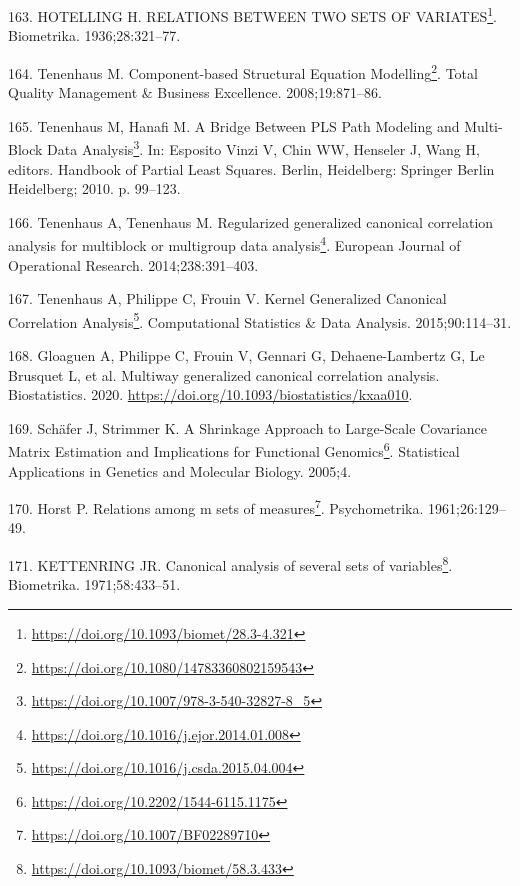 \documentclass[
  12pt,
  a4paper,
  twoside,
  openright]{book}
\DeclareRobustCommand{\href}[2]{#2\footnote{\url{#1}}}
\newlength{\cslhangindent}
\newlength{\cslentryspacingunit} %
\newenvironment{CSLReferences}[2] %
 {%
  \setlength{\parindent}{0pt}
  \ifodd #1
  \let\oldpar\par
  \def\par{\hangindent=\cslhangindent\oldpar}
  \fi
  \setlength{\parskip}{#2\cslentryspacingunit}
 }%
 {}
\begin{document}
\begin{CSLReferences}{0}{0}
\leavevmode{}%
163. HOTELLING H. \href{https://doi.org/10.1093/biomet/28.3-4.321}{RELATIONS BETWEEN TWO SETS OF VARIATES}. Biometrika. 1936;28:321--77.

\leavevmode{}%
164. Tenenhaus M. \href{https://doi.org/10.1080/14783360802159543}{Component-based {Structural Equation Modelling}}. Total Quality Management \& Business Excellence. 2008;19:871--86.

\leavevmode{}%
165. Tenenhaus M, Hanafi M. \href{https://doi.org/10.1007/978-3-540-32827-8_5}{A {Bridge Between PLS Path Modeling} and {Multi}-{Block Data Analysis}}. In: Esposito Vinzi V, Chin WW, Henseler J, Wang H, editors. Handbook of {Partial Least Squares}. Berlin, Heidelberg: {Springer Berlin Heidelberg}; 2010. p. 99--123.

\leavevmode{}%
166. Tenenhaus A, Tenenhaus M. \href{https://doi.org/10.1016/j.ejor.2014.01.008}{Regularized generalized canonical correlation analysis for multiblock or multigroup data analysis}. European Journal of Operational Research. 2014;238:391--403.

\leavevmode{}%
167. Tenenhaus A, Philippe C, Frouin V. \href{https://doi.org/10.1016/j.csda.2015.04.004}{Kernel {Generalized Canonical Correlation Analysis}}. Computational Statistics \& Data Analysis. 2015;90:114--31.

\leavevmode{}%
168. Gloaguen A, Philippe C, Frouin V, Gennari G, Dehaene-Lambertz G, Le Brusquet L, et al. Multiway generalized canonical correlation analysis. Biostatistics. 2020. \url{https://doi.org/10.1093/biostatistics/kxaa010}.

\leavevmode{}%
169. Schäfer J, Strimmer K. \href{https://doi.org/10.2202/1544-6115.1175}{A Shrinkage Approach to Large-Scale Covariance Matrix Estimation and Implications for Functional Genomics}. Statistical Applications in Genetics and Molecular Biology. 2005;4.

\leavevmode{}%
170. Horst P. \href{https://doi.org/10.1007/BF02289710}{Relations among m sets of measures}. Psychometrika. 1961;26:129--49.

\leavevmode{}%
171. KETTENRING JR. \href{https://doi.org/10.1093/biomet/58.3.433}{Canonical analysis of several sets of variables}. Biometrika. 1971;58:433--51.


\end{CSLReferences}
\end{document}
